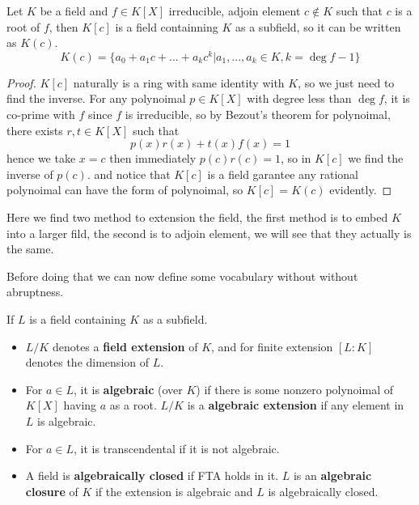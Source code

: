 \documentclass[en,geye,blue,normal,12pt]{elegantnote}
\begin{document}
\begin{proposition}
  Let \(K\) be a field and \(f \in K[X]\) irreducible, adjoin element \(c \notin K\) such that \(c\) is a root of \(f\), then \(K[c]\) is a field containning \(K\) as a subfield, so it can be written as \(K(c)\).
  \[K(c) = \{a_0+a_1c+...+a_kc^k| a_1,...,a_k \in K, k= \deg f-1\}\]
  \begin{proof}
    \(K[c]\) naturally is a ring with same identity with \(K\), so we just need to find the inverse. For any polynoimal \(p \in K[X]\) with degree less than \(\deg f\), it is co-prime with \(f\) since \(f\) is irreducible, so by Bezout's theorem for polynoimal, there exists \(r, t \in K[X]\) such that 
    \[p(x)r(x)+t(x)f(x) = 1\]
    hence we take \(x = c\) then immediately \(p(c)r(c) = 1\), so in \(K[c]\) we find the inverse of \(p(c)\). and notice that \(K[c]\) is a field garantee any rational polynoimal can have the form of polynoimal, so \(K[c] = K(c)\) evidently.
  \end{proof}
\end{proposition}

Here we find two method to extension the field, the first method is to embed \(K\) into a larger fild, the second is to adjoin element, we will see that they actually is the same.

Before doing that we can now define some vocabulary without without abruptness.
\begin{definition} 
  If \(L\) is a field containing \(K\) as a subfield.
  \begin{itemize}
    \item   \(L/K\) denotes a \textbf{field extension} of \(K\), and for finite extension \([L:K]\) denotes the dimension of \(L\).
    \item For \(a \in L \), it is \textbf{algebraic} (over \(K\)) if there is some nonzero polynoimal of \(K[X]\) having \(a\) as a root. \(L/K\) is a \textbf{algebraic extension} if any element in \(L\) is algebraic.
    \item For \(a \in L\), it is transcendental if it is not algebraic.
    \item A field is \textbf{algebraically closed} if FTA holds in it. \(L\) is an \textbf{algebraic closure} of \(K\) if the extension is algebraic and \(L\) is algebraically closed.
  \end{itemize}
\end{definition}
\end{document}
